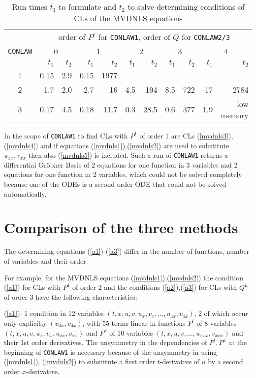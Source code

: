 \small
\begin{table}
\begin{center}
\begin{tabular}{|c|r|r|r|r|r|r|r|r|r|r|}  \hline
             & \multicolumn{10}{c|}{order of $P^t$ for {\tt CONLAW1}, 
                 order of $Q$ for {\tt CONLAW2/3}} \\ \cline{2-11}
{\tt CONLAW} & 
\multicolumn{2}{c|}{0} &
\multicolumn{2}{c|}{1} &
\multicolumn{2}{c|}{2} &
\multicolumn{2}{c|}{3} &
\multicolumn{2}{c|}{4} \\  \cline{2-11}
 & $t_1$ & $t_2$ & $t_1$ & $t_2$ & $t_1$ & $t_2$ & $t_1$ & $t_2$ & $t_1$ & $t_2$     \\ \hline
 1 & 0.15 & 2.9 & 0.15 & 1977 & & & & & &     \\ \hline
 2 & 1.7 & 2.0 & 2.7 & 16 & 4.5 & 194 & 8.5 & 722 & 17 & 2784 \\ \hline
 3 & 0.17 & 4.5 & 0.18 & 11.7 & 0.3 & 28.5 & 0.6 & 377 & 1.9 & low memory  \\ \hline
\end{tabular}
\caption{Run times $t_1$ to formulate and $t_2$ to solve 
determining conditions of CLs of the MVDNLS equations}
\end{center}
\end{table}
\normalsize
In the scope of
{\tt CONLAW1} to find CLs with $P^1$ of order 1 are CLs 
(\ref{mvdnls3}),(\ref{mvdnls4}) and if equations 
(\ref{mvdnls1}),(\ref{mvdnls2}) are used to substitute $u_{xx}, v_{xx}$
then also (\ref{mvdnls5}) is included.
Such a run of {\tt CONLAW1} returns a differential Gr\"{o}bner
Basis of 2 equations for one function in 3 variables and 2 equations
for one function in 2 variables,
which could not be solved completely because one of the ODEs is a 
second order ODE that could not be solved automatically.

\section{Comparison of the three methods}
The determining equations (\ref{a1})-(\ref{a3}) differ in the
number of functions, number of variables and their order. 

For example, for the MVDNLS equations (\ref{mvdnls1}),(\ref{mvdnls2})
the condition (\ref{a1}) for CLs with $P^1$ of order 2 and
the conditions (\ref{a2}),(\ref{a3}) for CLs with $Q^{\mu}$ of
order 3 have the following characteristics:

(\ref{a1}): 1 condition in 12 variables 
$(t,x,u,v,u_x,v_x,\!\ldots\!,u_{4x},v_{4x})$,
2 of which occur only explicitly $(u_{4x},v_{4x})$,
with 55 terms linear in functions 
$P^t$ of  8 variables $(t,x,u,v,u_x,v_x,u_{xx},v_{xx})$ and 
$P^x$ of 10 variables $(t,x,u,v,\!\ldots\!,u_{xxx},v_{xxx})$
and their 1st order derivatives. The unsymmetry in the dependencies of
$P^t,P^x$ at the beginning of {\tt CONLAW1}
is necessary because of the unsymmetry in using (\ref{mvdnls1}),
(\ref{mvdnls2}) to substitute a first order $t$-derivative of $u$
by a second order $x$-derivative.

